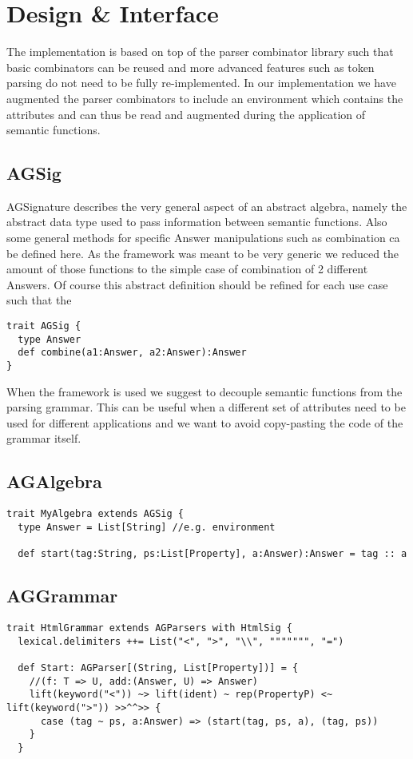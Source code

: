 \section{Design \& Interface}
The implementation is based on top of the parser combinator library such that basic combinators can be reused and more advanced features such as token parsing do not need to be fully re-implemented. In our implementation we have augmented the parser combinators to include an environment which contains the attributes and can thus be read and augmented during the application of semantic functions.

\subsection{AGSig}
AGSignature describes the very general aspect of an abstract algebra, namely the abstract data type used to pass information between semantic functions. Also some general methods for specific Answer manipulations such as combination ca be defined here. As the framework was meant to be very generic we reduced the amount of those functions to the simple case of combination of 2 different Answers. Of course this abstract definition should be refined for each use case such that the 
\begin{lstlisting}
trait AGSig {
  type Answer
  def combine(a1:Answer, a2:Answer):Answer
}
\end{lstlisting}

When the framework is used we suggest to decouple semantic functions from the parsing grammar. This can be useful when a different set of attributes need to be used for different applications and we want to avoid copy-pasting the code of the grammar itself. 

\subsection{AGAlgebra}
\begin{lstlisting}
trait MyAlgebra extends AGSig {
  type Answer = List[String] //e.g. environment

  def start(tag:String, ps:List[Property], a:Answer):Answer = tag :: a
\end{lstlisting}

\subsection{AGGrammar}
\begin{lstlisting}
trait HtmlGrammar extends AGParsers with HtmlSig {
  lexical.delimiters ++= List("<", ">", "\\", """"""", "=")

  def Start: AGParser[(String, List[Property])] = {
    //(f: T => U, add:(Answer, U) => Answer)
    lift(keyword("<")) ~> lift(ident) ~ rep(PropertyP) <~ lift(keyword(">")) >>^^>> {
      case (tag ~ ps, a:Answer) => (start(tag, ps, a), (tag, ps))
    }
  }
\end{lstlisting}

